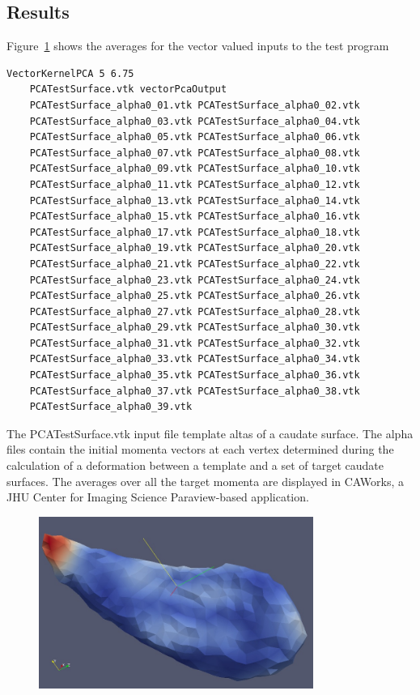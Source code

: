 \documentclass{InsightArticle}
\begin{document}
\subsection{Results}

Figure~\ref{fig:FirstPCCaudate} shows the averages for the vector
valued inputs to the test program

\begin{verbatim}VectorKernelPCA 5 6.75
    PCATestSurface.vtk vectorPcaOutput
    PCATestSurface_alpha0_01.vtk PCATestSurface_alpha0_02.vtk
    PCATestSurface_alpha0_03.vtk PCATestSurface_alpha0_04.vtk
    PCATestSurface_alpha0_05.vtk PCATestSurface_alpha0_06.vtk
    PCATestSurface_alpha0_07.vtk PCATestSurface_alpha0_08.vtk
    PCATestSurface_alpha0_09.vtk PCATestSurface_alpha0_10.vtk
    PCATestSurface_alpha0_11.vtk PCATestSurface_alpha0_12.vtk
    PCATestSurface_alpha0_13.vtk PCATestSurface_alpha0_14.vtk
    PCATestSurface_alpha0_15.vtk PCATestSurface_alpha0_16.vtk
    PCATestSurface_alpha0_17.vtk PCATestSurface_alpha0_18.vtk
    PCATestSurface_alpha0_19.vtk PCATestSurface_alpha0_20.vtk
    PCATestSurface_alpha0_21.vtk PCATestSurface_alpha0_22.vtk
    PCATestSurface_alpha0_23.vtk PCATestSurface_alpha0_24.vtk
    PCATestSurface_alpha0_25.vtk PCATestSurface_alpha0_26.vtk
    PCATestSurface_alpha0_27.vtk PCATestSurface_alpha0_28.vtk
    PCATestSurface_alpha0_29.vtk PCATestSurface_alpha0_30.vtk
    PCATestSurface_alpha0_31.vtk PCATestSurface_alpha0_32.vtk
    PCATestSurface_alpha0_33.vtk PCATestSurface_alpha0_34.vtk
    PCATestSurface_alpha0_35.vtk PCATestSurface_alpha0_36.vtk
    PCATestSurface_alpha0_37.vtk PCATestSurface_alpha0_38.vtk
    PCATestSurface_alpha0_39.vtk
\end{verbatim}

The PCATestSurface.vtk input file template altas of a caudate surface.  The alpha files
contain the initial momenta vectors at each vertex determined during the calculation of a
deformation between a template and a set of target caudate surfaces.
The averages over all the target momenta are displayed in CAWorks, a JHU Center for
Imaging Science Paraview-based application.

\begin{figure}
\center
\includegraphics[width=0.8\textwidth]{CaudateFirstPrincipalComponentOnMomentum.jpg}
\label{fig:FirstPCCaudate}
\end{figure}
\end{document}
